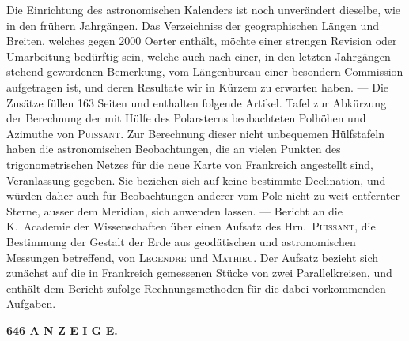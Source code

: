 \documentclass[12pt,a4paper]{article}
\begin{document}
\vspace{2mm}

Die Einrichtung des astronomischen Kalenders ist noch unver\"andert dieselbe, wie in den fr\"uhern Jahrg\"angen. Das Verzeichniss der geographischen L\"angen und Breiten, welches gegen 2000 Oerter enth\"alt, m\"ochte einer strengen Revision oder Umarbeitung bed\"urftig sein, welche auch nach einer, in den letzten Jahrg\"angen stehend gewordenen Bemerkung, vom L\"angenbureau einer besondern Commission aufgetragen ist, und deren Resultate wir in K\"urzem zu erwarten haben. --- Die Zus\"atze f\"ullen 163 Seiten und enthalten folgende Artikel. Tafel zur Abk\"urzung der Berechnung der mit H\"ulfe des Polarsterns beobachteten Polh\"ohen und Azimuthe von \textsc{Puissant}. Zur Berechnung dieser nicht unbequemen H\"ulfstafeln haben die astronomischen Beobachtungen, die an vielen Punkten des trigonometrischen Netzes f\"ur die neue Karte von Frankreich angestellt sind, Veranlassung gegeben. Sie beziehen sich auf keine bestimmte Declination, und w\"urden daher auch f\"ur Beobachtungen anderer vom Pole nicht zu weit entfernter Sterne, ausser dem Meridian, sich anwenden lassen. --- Bericht an die K.\ Academie der Wissenschaften \"uber einen Aufsatz des Hrn.\ \textsc{Puissant}, die Bestimmung der Gestalt der Erde aus geod\"atischen und astronomischen Messungen betreffend, von \textsc{Legendre} und \textsc{Mathieu}. Der Aufsatz bezieht sich zun\"achst auf die in Frankreich gemessenen St\"ucke von zwei Parallelkreisen, und enth\"alt dem Bericht zufolge Rechnungsmethoden f\"ur die dabei vorkommenden Aufgaben.

\begin{center}\small\textbf{646 A N Z E I G E.}\end{center}
\end{document}
